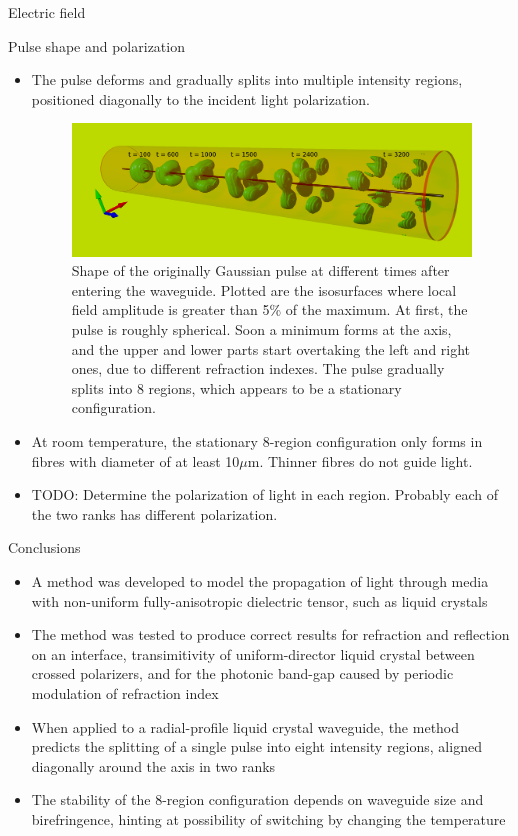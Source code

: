 \documentclass[8pt]{beamer}
\newlength{\wideitemsep}
\let\olditem\item
\renewcommand{\item}{\setlength{\itemsep}{\wideitemsep}\olditem}
\newcommand{\blockpadding}{
  \rule[-0.6ex]{0pt}{2.5ex}
}
\begin{document}
\begin{columns}[t]
\begin{column}{0.596\textwidth}
\begin{block}{\blockpadding Electric field}
\end{block}
\begin{block}{\blockpadding Pulse shape and polarization}
\begin{itemize}
\item The pulse deforms and gradually splits into multiple intensity regions, positioned diagonally to the incident light polarization. 
\vspace{.3ex}
 \begin{figure}[h]
  \centering
  \includegraphics[width=.825\textwidth]{./intensity_gauss_t}
  \caption{Shape of the originally Gaussian pulse at different times after entering the waveguide. Plotted are the isosurfaces where local field amplitude is greater than 5\% of the maximum. At first, the pulse is roughly spherical. Soon a minimum forms at the axis, and the upper and lower parts start overtaking the left and right ones, due to different refraction indexes. The pulse gradually splits into 8 regions, which appears to be a stationary configuration. }
 \end{figure}

 \item At room temperature, the stationary 8-region configuration only forms in fibres with diameter of at least 10$\mu$m. Thinner fibres do not guide light. 
 \item TODO: Determine the polarization of light in each region. Probably each of the two ranks has different polarization. 
\end{itemize}


\end{block}

\begin{block}{\blockpadding Conclusions}
 \begin{itemize}
  \item A method was developed to model the propagation of light through media with non-uniform fully-anisotropic dielectric tensor, such as liquid crystals
  \item The method was tested to produce correct results for refraction and reflection on an interface, transimitivity of uniform-director liquid crystal between crossed polarizers, and for the photonic band-gap caused by periodic modulation of refraction index
  \item When applied to a radial-profile liquid crystal waveguide, the method predicts the splitting of a single pulse into eight intensity regions, aligned diagonally around the axis in two ranks
  \item The stability of the 8-region configuration depends on waveguide size and birefringence, hinting at possibility of switching by changing the temperature
 \end{itemize}


\end{block}
\end{column}
\end{columns}
\end{document}
